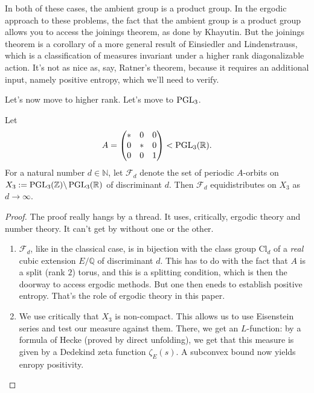 \documentclass[reqno]{amsart} 
\begin{document}
\begin{remark}
  In both of these cases, the ambient group is a product group.  In the ergodic approach to these problems, the fact that the ambient group is a product group allows you to access the joinings theorem, as done by Khayutin.  But the joinings theorem is a corollary of a more general result of Einsiedler and Lindenstrauss, which is a classification of measures invariant under a higher rank diagonalizable action.  It's not as nice as, say, Ratner's theorem, because it requires an additional input, namely positive entropy, which we'll need to verify.
\end{remark}
Let's now move to higher rank.  Let's move to $\operatorname{PGL}_3$.
\begin{theorem}[ELMV, 2006]
  Let
  \begin{equation*}
    A =
    \begin{pmatrix}
      \ast & 0 & 0 \\
      0 & \ast & 0 \\
      0 & 0 & 1 \\
    \end{pmatrix}
    < \operatorname{PGL}_3 (\mathbb{R}).
  \end{equation*}
  For a natural number $d \in \mathbb{N} $, let $\mathcal{F}_d$ denote the set of periodic $A$-orbits on $X_3 := \operatorname{PGL}_3(\mathbb{Z}) \backslash \operatorname{PGL}_3(\mathbb{R})$ of discriminant $d$.  Then $\mathcal{F}_d $ equidistributes on $X_3 $ as $d \rightarrow \infty $.
\end{theorem}
\begin{proof}
  The proof really hangs by a thread.  It uses, critically, ergodic theory and number theory.  It can't get by without one or the other.
\begin{enumerate}
\item  $\mathcal{F}_d $, like in the classical case, is in bijection with the class group $\mathrm{Cl}_d $ of a \emph{real} cubic extension $E/\mathbb{Q}$ of discriminant $d$.  This has to do with the fact that $A$ is a split (rank $2$) torus, and this is a splitting condition, which is then the doorway to access ergodic methods.  But one then eneds to establish positive entropy.  That's the role of ergodic theory in this paper.
\item We use critically that $X_3 $ is non-compact.  This allows us to use Eisenstein series and test our measure against them.  There, we get an $L$-function: by a formula of Hecke (proved by direct unfolding), we get that this measure is given by a Dedekind zeta function $\zeta_E (s)$.  A subconvex bound now yields enropy positivity.
\end{enumerate}  
\end{proof}
\end{document}
